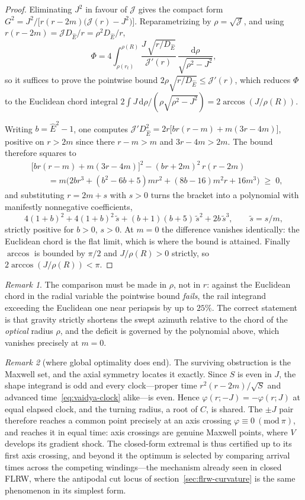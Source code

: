 \documentclass[12pt]{iopart}
\newcommand{\Ehat}{\hat E}
\newcommand{\dd}{\mathrm{d}}
\theoremstyle{plain}
\theoremstyle{definition}
\theoremstyle{plain}
\theoremstyle{remark}
\newtheorem*{remark}{Remark}
\begin{document}
\begin{proof}
Eliminating $J^2$ in favour of $\mathcal J$ gives the compact form
$G^2=J^2/\big[r(r-2m)\big(\mathcal J(r)-J^2\big)\big]$. Reparametrizing by
$\rho=\sqrt{\mathcal J}$, and using $r(r-2m)=\mathcal J D_{\Ehat}/r=\rho^2D_{\Ehat}/r$,
\[
   \Phi=4\int_{\rho(r_t)}^{\rho(R)}
   \frac{J\,\sqrt{r/D_{\Ehat}}}{\mathcal J'(r)}\,
   \frac{\dd\rho}{\sqrt{\rho^2-J^2}} ,
\]
so it suffices to prove the pointwise bound $2\rho\sqrt{r/D_{\Ehat}}\le\mathcal J'(r)$,
which reduces $\Phi$ to the Euclidean chord integral
$2\int J\,\dd\rho/(\rho\sqrt{\rho^2-J^2})=2\arccos(J/\rho(R))$.

Writing $b=\Ehat^2-1$, one computes
$\mathcal J'D_{\Ehat}^2=2r\big[br(r-m)+m(3r-4m)\big]$, positive on $r>2m$ since there
$r-m>m$ and $3r-4m>2m$. The bound therefore squares to
\begin{align*}
   &\big[br(r-m)+m(3r-4m)\big]^2-(br+2m)^2\,r(r-2m)\\
   &\qquad=m\big(2br^3+(b^2-6b+5)mr^2+(8b-16)m^2r+16m^3\big)\;\ge\;0 ,
\end{align*}
and substituting $r=2m+s$ with $s>0$ turns the bracket into a polynomial with manifestly
nonnegative coefficients,
\[
   4(1+b)^2+4(1+b)^2\,\tilde s+(b+1)(b+5)\,\tilde s^{2}+2b\,\tilde s^{3},
   \qquad \tilde s=s/m ,
\]
strictly positive for $b>0$, $s>0$. At $m=0$ the difference vanishes identically: the
Euclidean chord is the flat limit, which is where the bound is attained. Finally
$\arccos$ is bounded by $\pi/2$ and $J/\rho(R)>0$ strictly, so
$2\arccos(J/\rho(R))<\pi$.
\end{proof}

\begin{remark}
The comparison must be made in $\rho$, not in $r$: against the Euclidean chord in the
radial variable the pointwise bound \emph{fails}, the rail integrand exceeding the
Euclidean one near periapsis by up to $25\%$. The correct statement is that gravity
strictly shortens the swept azimuth relative to the chord of the \emph{optical} radius
$\rho$, and the deficit is governed by the polynomial above, which vanishes precisely at
$m=0$.
\end{remark}

\begin{remark}[where global optimality does end]\label{rem:maxwell}
The surviving obstruction is the Maxwell set, and the axial symmetry locates it exactly.
Since $S$ is even in $J$, the shape integrand is odd and every clock---proper time
$r^2(r-2m)/\sqrt S$ and advanced time~\eqref{eq:vaidya-clock} alike---is even. Hence
$\varphi(r;-J)=-\varphi(r;J)$ at equal elapsed clock, and the turning radius, a root of
$C$, is shared. The $\pm J$ pair therefore reaches a common point precisely at an axis
crossing $\varphi\equiv0\ (\mathrm{mod}\ \pi)$, and reaches it in equal time: axis
crossings are genuine Maxwell points, where $V$ develops its gradient shock. The closed-form
extremal is thus certified up to its first axis crossing, and beyond it the optimum is
selected by comparing arrival times across the competing windings---the mechanism already
seen in closed FLRW, where the antipodal cut locus of section~\ref{sec:flrw-curvature} is
the same phenomenon in its simplest form.
\end{remark}
\end{document}
